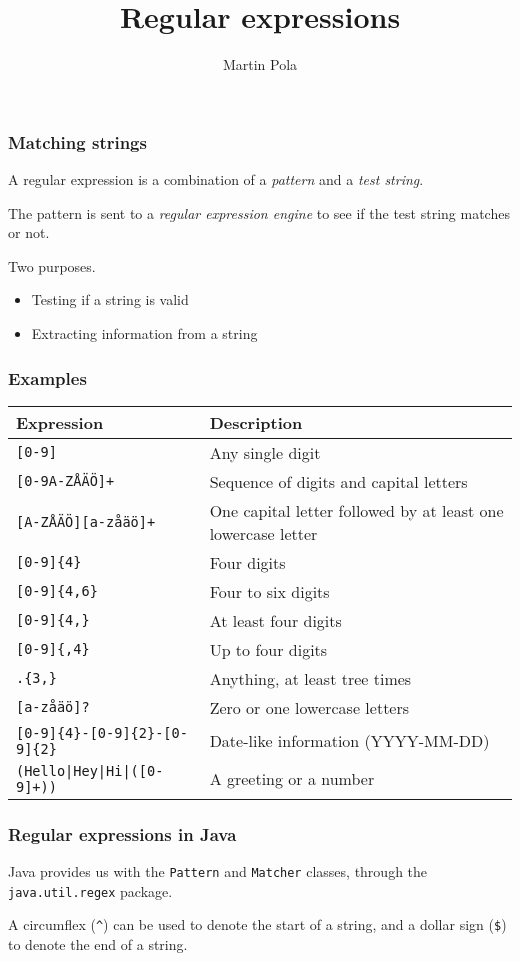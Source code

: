 \documentclass{beamer}
\title{Regular expressions}
\author{Martin Pola}
\date{}
\begin{document}
	\maketitle
	
	\frame
	{
		\frametitle{Matching strings}

		A regular expression is a combination of a \emph{pattern} and a \emph{test string}.
		
		\pause
		The pattern is sent to a \emph{regular expression engine} to see if the test string matches or not.

		\pause
		Two purposes.
		\begin{itemize}
			\item Testing if a string is valid
			\item Extracting information from a string
		\end{itemize}
	}

	\begin{frame}
		\frametitle{Examples}

		\begin{tabularx}{\textwidth}{lX}
			\textbf{Expression} & \textbf{Description} \\ \hline
			\texttt{[0-9]} & Any single digit \\
			\texttt{[0-9A-ZÅÄÖ]+} & Sequence of digits and capital letters \\
			\texttt{[A-ZÅÄÖ][a-zåäö]+} & One capital letter followed by at least one lowercase letter \\
			\texttt{[0-9]\{4\}} & Four digits \\
			\texttt{[0-9]\{4,6\}} & Four to six digits \\
			\texttt{[0-9]\{4,\}} & At least four digits \\
			\texttt{[0-9]\{,4\}} & Up to four digits \\
			\texttt{.\{3,\}} & Anything, at least tree times \\
			\texttt{[a-zåäö]?} & Zero or one lowercase letters \\
			\texttt{[0-9]\{4\}-[0-9]\{2\}-[0-9]\{2\}} & Date-like information (YYYY-MM-DD) \\
			\texttt{(Hello|Hey|Hi|([0-9]+))} & A greeting or a number \\
		\end{tabularx}
	\end{frame}

	\begin{frame}
		\frametitle{Regular expressions in Java}

		Java provides us with the \texttt{Pattern} and \texttt{Matcher} classes, through the \texttt{java.util.regex} package.

		

		\pause
		A circumflex (\texttt{\^}) can be used to denote the start of a string, and a dollar sign (\texttt{\$}) to denote the end of a string.
	\end{frame}
\end{document}
